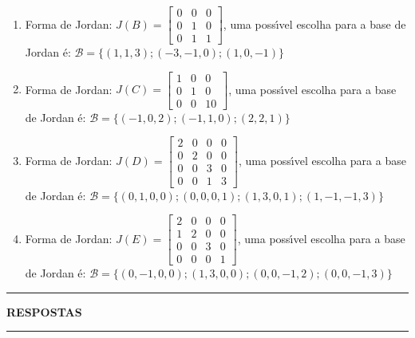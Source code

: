 \documentclass[12pt]{exam}
\begin{document}
\begin{exercicio}
\begin{solucao}
\begin{enumerate}[label=({\alph*})]
      \item Forma de Jordan: $J(B) = \begin{bmatrix}
        0 & 0 & 0\\
        0 & 1 & 0\\
        0 & 1 & 1
      \end{bmatrix}$, uma poss{\'\i}vel escolha para a base de Jordan \'e: $\mathcal{B} = \{(1,1,3);(-3,-1,0);(1,0,-1)\}$
      \item Forma de Jordan: $J(C) = \begin{bmatrix}
        1 & 0 & 0\\
        0 & 1 & 0\\
        0 & 0 & 10
      \end{bmatrix}$, uma poss{\'\i}vel escolha para a base de Jordan \'e: $\mathcal{B} = \{(-1,0,2);(-1,1,0);(2,2,1)\}$
      \item Forma de Jordan: $J(D) = \begin{bmatrix}
        2 & 0 & 0 & 0\\
        0 & 2 & 0 & 0\\
        0 & 0 & 3 & 0\\
        0 & 0 & 1 & 3
      \end{bmatrix}$, uma poss{\'\i}vel escolha para a base de Jordan \'e: $\mathcal{B} = \{(0,1,0,0);(0,0,0,1);(1,3,0,1);(1,-1,-1,3)\}$
      \item Forma de Jordan: $J(E) = \begin{bmatrix}
        2 & 0 & 0 & 0\\
        1 & 2 & 0 & 0\\
        0 & 0 & 3 & 0\\
        0 & 0 & 0 & 1
      \end{bmatrix}$, uma poss{\'\i}vel escolha para a base de Jordan \'e: $\mathcal{B} = \{(0,-1,0,0);(1,3,0,0);(0,0,-1,2);(0,0,-1,3)\}$
    \end{enumerate}
  \end{solucao}
\end{exercicio}

\newpage
{}
\hrule
\begin{center}
{\large\bf RESPOSTAS}
\end{center}
\hrule

\end{document}
